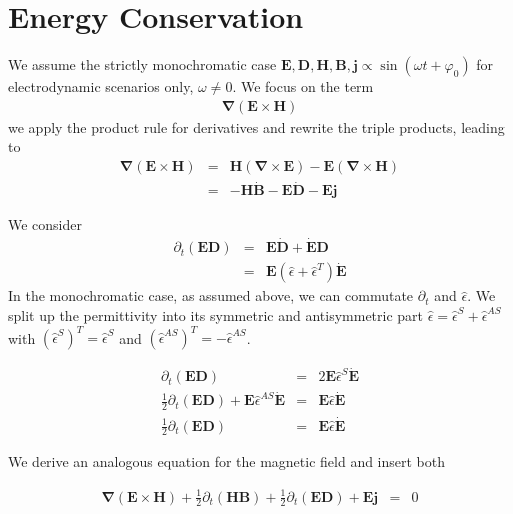 \documentclass[12pt,a4paper,twoside,openright,BCOR10mm,headsepline,titlepage,abstracton,chapterprefix,final]{scrreprt}
\newcommand\Vector[1]{{\mathbf{#1}}}
\newcommand\Nabla{\Vector{\nabla}}
\newcommand\timederivative[1]{\dot{{#1}}}
\newcommand\Tensor[1]{\hat{#1}}
\newcommand\scalarEfield{E}
\newcommand\scalarBfield{B}
\newcommand\scalarHfield{H}
\newcommand\scalarDfield{D}
\newcommand\Efield{\Vector{\scalarEfield}}
\newcommand\Bfield{\Vector{\scalarBfield}}
\newcommand\Hfield{\Vector{\scalarHfield}}
\newcommand\Dfield{\Vector{\scalarDfield}}
\newcommand\permittivity{\Tensor{\epsilon}}
\newcommand\currentdensity{\Vector{j}}
\begin{document}
\section{Energy Conservation}
We assume the strictly monochromatic case $\Efield,\Dfield,\Hfield,\Bfield, \currentdensity \propto \sin(\omega t + \varphi_0)$ for electrodynamic scenarios only, $\omega \neq 0$.
We focus on the term
\begin{eqnarray}
   \Nabla ( \Efield \times \Hfield )
\end{eqnarray}
we apply the product rule for derivatives and rewrite the triple products, leading to
\begin{eqnarray}
   \Nabla ( \Efield \times \Hfield ) &=& \Hfield ( \Nabla \times \Efield ) - \Efield ( \Nabla \times \Hfield ) \\
   &=& - \Hfield \timederivative{\Bfield} - \Efield  \timederivative{\Dfield} - \Efield \currentdensity
\end{eqnarray}

We consider
\begin{eqnarray}
 \partial_t (\Efield \Dfield) &=& \Efield  \timederivative{\Dfield} +  \timederivative{\Efield} \Dfield \\
                              &=& \Efield ( \permittivity + \permittivity^T ) \timederivative{\Efield} 
\end{eqnarray}
In the monochromatic case, as assumed above, we can commutate $\partial_t$ and $\permittivity$.
We split up the permittivity into its symmetric and antisymmetric part $\permittivity =  \permittivity^S +  \permittivity^{AS}$ with
$(\permittivity^S)^T = \permittivity^S$ and $(\permittivity^{AS})^T = - \permittivity^{AS}$. 

\begin{eqnarray}
 \partial_t (\Efield \Dfield)                                                                  &=& 2 \Efield \permittivity^S \timederivative{\Efield} \\
 \frac{1}{2} \partial_t (\Efield \Dfield)+ \Efield \permittivity^{AS} \timederivative{\Efield} &=&   \Efield  \permittivity \timederivative{\Efield} \\
 \frac{1}{2} \partial_t (\Efield \Dfield)                                                      &=&   \Efield  \permittivity \timederivative{\Efield}
\end{eqnarray}

We derive an analogous equation for the magnetic field and insert both

\begin{eqnarray}
   \Nabla ( \Efield \times \Hfield ) + \frac{1}{2} \partial_t (\Hfield \Bfield) + \frac{1}{2} \partial_t (\Efield \Dfield) + \Efield \currentdensity &=& 0
\end{eqnarray}
\end{document}
